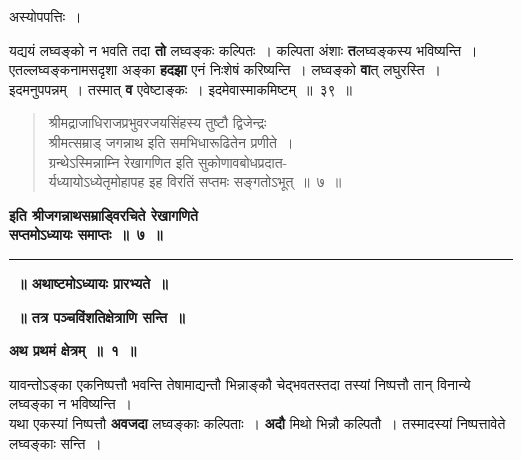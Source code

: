 \documentclass[11pt, openany]{book}
\begin{document}
\begin{center}
अस्योपपत्तिः~।
\end{center}

 यद्ययं लघ्वङ्को न भवति तदा \textbf{तो} लघ्वङ्कः कल्पितः~। कल्पिता अंशाः \textbf{त}लघ्वङ्कस्य भविष्यन्ति~। एतल्लघ्वङ्कनामसदृशा अङ्का \textbf{हदझा} एनं निःशेषं करिष्यन्ति~। लघ्वङ्को \textbf{वा}त् लघुरस्ति~। इदमनुपपन्नम्~। तस्मात् \textbf{व} एवेष्टाङ्कः~। इदमेवास्माकमिष्टम्~॥~३९~॥
\vspace{2mm}
 
\begin{quote}
\qt
श्रीमद्राजाधिराजप्रभुवरजयसिंहस्य तुष्टौ द्विजेन्द्रः \\
श्रीमत्सम्राड् जगन्नाथ इति समभिधारूढितेन प्रणीते~। \\
ग्रन्थेऽस्मिन्नाम्नि रेखागणित इति सुकोणावबोधप्रदात-\\ 
र्यध्यायोऽध्येतृमोहापह इह विरतिं सप्तमः सङ्गतोऽभूत्~॥~७~॥ 
\end{quote}
\vspace{-1mm}

\begin{center}
\textbf{\large इति श्रीजगन्नाथसम्राड्विरचिते रेखागणिते \\
 सप्तमोऽध्यायः समाप्तः~॥~७~॥} \\
\vspace{6mm} 

\rule{0.9in}{0.8pt}
\end{center}

\afterpage{\fancyhead[LE,RO]{\thepage}}
\cfoot{}
\newpage
\newpage
\thispagestyle{empty}
 \label{ch8}
\begin{center}
{\bf \LARGE~॥ अथाष्टमोऽध्यायः प्रारभ्यते~॥}
\vspace{5mm}

\textbf{~॥ तत्र पञ्चविंशतिक्षेत्राणि सन्ति~॥}
\vspace{5mm}

\textbf{\large अथ प्रथमं क्षेत्रम्~॥~१~॥}
\end{center}

 {\ab यावन्तोऽङ्का एकनिष्पत्तौ भवन्ति तेषामाद्यन्तौ भिन्नाङ्कौ चेद्भवतस्तदा तस्यां निष्पत्तौ तान् विनान्ये लघ्वङ्का न भविष्यन्ति~। }\\

 यथा एकस्यां निष्पत्तौ \textbf{अवजदा} लघ्वङ्काः कल्पिताः~। \textbf{अदौ} मिथो भिन्नौ कल्पितौ~। तस्मादस्यां निष्पत्तावेते लघ्वङ्काः सन्ति~। 
\end{document}
